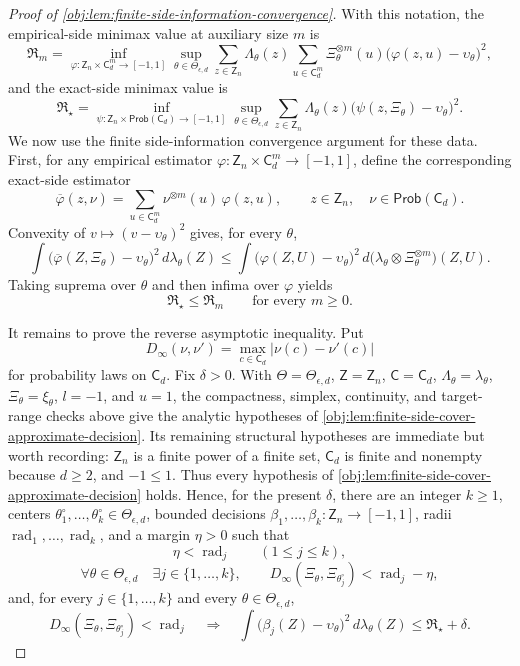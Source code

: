 \documentclass[11pt]{article}
\begin{document}
\begin{proof}[Proof of \cref{obj:lem:finite-side-information-convergence}]
With this notation, the empirical-side minimax value at auxiliary size \(m\) is
\[
\mathfrak R_m
=
\inf_{\varphi:\mathsf Z_n\times\mathsf C_d^m\to[-1,1]}
\sup_{\theta\in\Theta_{\epsilon,d}}
\sum_{z\in\mathsf Z_n}\Lambda_\theta(z)
\sum_{u\in\mathsf C_d^m}\Xi_\theta^{\otimes m}(u)
\bigl(\varphi(z,u)-\upsilon_\theta\bigr)^2,
\]
and the exact-side minimax value is
\[
\mathfrak R_\star
=
\inf_{\psi:\mathsf Z_n\times\mathsf{Prob}(\mathsf C_d)\to[-1,1]}
\sup_{\theta\in\Theta_{\epsilon,d}}
\sum_{z\in\mathsf Z_n}\Lambda_\theta(z)
\bigl(\psi(z,\Xi_\theta)-\upsilon_\theta\bigr)^2 .
\]
We now use the finite side-information convergence argument for these data. First, for any
empirical estimator \(\varphi:\mathsf Z_n\times\mathsf C_d^m\to[-1,1]\), define the corresponding
exact-side estimator
\[
\overline\varphi(z,\nu)
=
\sum_{u\in\mathsf C_d^m}\nu^{\otimes m}(u)\,\varphi(z,u),
\qquad
z\in\mathsf Z_n,\quad \nu\in\mathsf{Prob}(\mathsf C_d).
\]
Convexity of \(v\mapsto(v-\upsilon_\theta)^2\) gives, for every \(\theta\),
\[
\int
\bigl(\overline\varphi(Z,\Xi_\theta)-\upsilon_\theta\bigr)^2\,d\lambda_\theta(Z)
\le
\int
\bigl(\varphi(Z,U)-\upsilon_\theta\bigr)^2\,
d\bigl(\lambda_\theta\otimes\Xi_\theta^{\otimes m}\bigr)(Z,U).
\]
Taking suprema over \(\theta\) and then infima over \(\varphi\) yields
\[
\mathfrak R_\star\le \mathfrak R_m
\qquad\text{for every }m\ge0 .
\]

It remains to prove the reverse asymptotic inequality. Put
\[
D_\infty(\nu,\nu')=\max_{c\in\mathsf C_d}|\nu(c)-\nu'(c)|
\]
for probability laws on \(\mathsf C_d\). Fix \(\delta>0\). With
\(\Theta=\Theta_{\epsilon,d}\), \(\mathsf Z=\mathsf Z_n\), \(\mathsf C=\mathsf C_d\),
\(\Lambda_\theta=\lambda_\theta\), \(\Xi_\theta=\xi_\theta\), \(l=-1\), and \(u=1\),
the compactness, simplex, continuity, and target-range checks above give the analytic hypotheses of
\cref{obj:lem:finite-side-cover-approximate-decision}. Its remaining structural hypotheses are
immediate but worth recording: \(\mathsf Z_n\) is a finite power of a finite set,
\(\mathsf C_d\) is finite and nonempty because \(d\ge2\), and \(-1\le1\). Thus every hypothesis of
\cref{obj:lem:finite-side-cover-approximate-decision} holds. Hence, for the present \(\delta\), there are
an integer \(k\ge1\), centers \(\theta^\circ_1,\ldots,\theta^\circ_k\in\Theta_{\epsilon,d}\),
bounded decisions \(\beta_1,\ldots,\beta_k:\mathsf Z_n\to[-1,1]\), radii
\(\operatorname{rad}_1,\ldots,\operatorname{rad}_k\), and a margin \(\eta>0\) such that
\[
\eta<\operatorname{rad}_j\qquad(1\le j\le k),
\]
\[
\forall\theta\in\Theta_{\epsilon,d}\quad
\exists j\in\{1,\ldots,k\},\qquad
D_\infty(\Xi_\theta,\Xi_{\theta^\circ_j})
<
\operatorname{rad}_j-\eta,
\]
and, for every \(j\in\{1,\ldots,k\}\) and every \(\theta\in\Theta_{\epsilon,d}\),
\[
D_\infty(\Xi_\theta,\Xi_{\theta^\circ_j})<\operatorname{rad}_j
\quad\Longrightarrow\quad
\int
\bigl(\beta_j(Z)-\upsilon_\theta\bigr)^2\,d\lambda_\theta(Z)
\le
\mathfrak R_\star+\delta .
\]


\end{proof}
\end{document}
